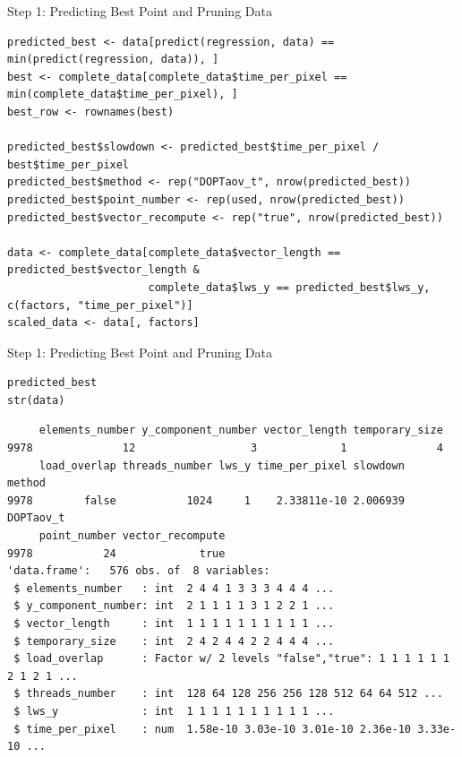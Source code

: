 \documentclass[10pt, compress, aspectratio=169, xcolor={table,usenames,dvipsnames}]{beamer}
\begin{document}
\begin{frame}[fragile,label={sec:org200bf55}]{Step 1: Predicting Best Point and Pruning Data}
 \lstset{language=r,label= ,caption= ,captionpos=b,numbers=none}
\begin{lstlisting}
predicted_best <- data[predict(regression, data) == min(predict(regression, data)), ]
best <- complete_data[complete_data$time_per_pixel == min(complete_data$time_per_pixel), ]
best_row <- rownames(best)

predicted_best$slowdown <- predicted_best$time_per_pixel / best$time_per_pixel
predicted_best$method <- rep("DOPTaov_t", nrow(predicted_best))
predicted_best$point_number <- rep(used, nrow(predicted_best))
predicted_best$vector_recompute <- rep("true", nrow(predicted_best))

data <- complete_data[complete_data$vector_length == predicted_best$vector_length &
                      complete_data$lws_y == predicted_best$lws_y, c(factors, "time_per_pixel")]
scaled_data <- data[, factors]
\end{lstlisting}
\end{frame}
\begin{frame}[fragile,label={sec:org80cebbc}]{Step 1: Predicting Best Point and Pruning Data}
 \scriptsize
\lstset{language=r,label= ,caption= ,captionpos=b,numbers=none}
\begin{lstlisting}
predicted_best
str(data)
\end{lstlisting}

\begin{verbatim}
     elements_number y_component_number vector_length temporary_size
9978              12                  3             1              4
     load_overlap threads_number lws_y time_per_pixel slowdown    method
9978        false           1024     1    2.33811e-10 2.006939 DOPTaov_t
     point_number vector_recompute
9978           24             true
'data.frame':	576 obs. of  8 variables:
 $ elements_number   : int  2 4 4 1 3 3 3 4 4 4 ...
 $ y_component_number: int  2 1 1 1 1 3 1 2 2 1 ...
 $ vector_length     : int  1 1 1 1 1 1 1 1 1 1 ...
 $ temporary_size    : int  2 4 2 4 4 2 2 4 4 4 ...
 $ load_overlap      : Factor w/ 2 levels "false","true": 1 1 1 1 1 1 2 1 2 1 ...
 $ threads_number    : int  128 64 128 256 256 128 512 64 64 512 ...
 $ lws_y             : int  1 1 1 1 1 1 1 1 1 1 ...
 $ time_per_pixel    : num  1.58e-10 3.03e-10 3.01e-10 2.36e-10 3.33e-10 ...
\end{verbatim}
\normalsize
\end{frame}
\end{document}
